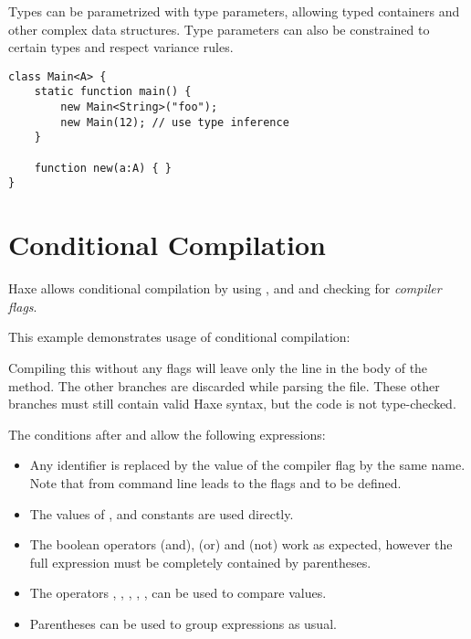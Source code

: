 Types can be parametrized with type parameters, allowing typed containers and other complex data structures. Type parameters can also be constrained to certain types and respect variance rules.

\begin{lstlisting}
class Main<A> {
    static function main() {
        new Main<String>("foo");
        new Main(12); // use type inference
    }

    function new(a:A) { }
}
\end{lstlisting}

\section{Conditional Compilation}
\label{lf-condition-compilation}

Haxe allows conditional compilation by using ,  and  and checking for \emph{compiler flags}.


This example demonstrates usage of conditional compilation:


Compiling this without any flags will leave only the  line in the body of the  method. The other branches are discarded while parsing the file. These other branches must still contain valid Haxe syntax, but the code is not type-checked.

The conditions after  and  allow the following expressions:

\begin{itemize}
	\item Any identifier is replaced by the value of the compiler flag by the same name. Note that  from command line leads to the flags  and  to be defined.
	\item The values of ,  and  constants are used directly.
		\item The boolean operators \expr{\&\&} (and), \expr{||} (or) and \expr{!} (not) work as expected, however the full expression must be completely contained by parentheses.
	\item The operators \expr{==}, \expr{!=}, \expr{>}, \expr{>=}, \expr{<}, \expr{<=} can be used to compare values.
	\item Parentheses \expr{()} can be used to group expressions as usual.
\end{itemize}


